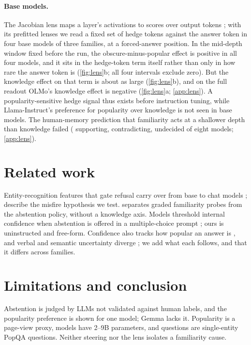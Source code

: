 \documentclass{article}
\begin{document}
\paragraph{Base models.} The Jacobian lens maps a layer's activations to scores over output tokens \citep{gurnee2026workspace}; with its prefitted lenses we read a fixed set of hedge tokens against the answer token in four base models of three families, at a forced-answer position. In the mid-depth window fixed before the run, the obscure-minus-popular effect is positive in all four models, and it sits in the hedge-token term itself rather than only in how rare the answer token is (\cref{fig:lens}b; all four intervals exclude zero). But the knowledge effect on that term is about as large (\cref{fig:lens}b), and on the full readout OLMo's knowledge effect is negative (\cref{fig:lens}a; \cref{app:lens}). A popularity-sensitive hedge signal thus exists before instruction tuning, while Llama-Instruct's preference for popularity over knowledge is not seen in base models. The human-memory prediction that familiarity acts at a shallower depth than knowledge \citep{koriat2001cascade} failed (\jlSupports{} supporting, \jlContradicts{} contradicting, \jlUndecided{} undecided of eight models; \cref{app:lens}).

\section{Related work}

Entity-recognition features that gate refusal carry over from base to chat models \citep{ferrando2025iknow}; \citet{lindsey2025biology} describe the misfire hypothesis we test. \citet{brzezinka2026familiarity} separates graded familiarity probes from the abstention policy, without a knowledge axis. Models threshold internal confidence when abstention is offered in a multiple-choice prompt \citep{kumaran2026confidence}; ours is uninstructed and free-form. Confidence also tracks how popular an answer is \citep{ni2025popular}, and verbal and semantic uncertainty diverge \citep{ji2025hedging}; we add what each follows, and that it differs across families.

\section{Limitations and conclusion}

Abstention is judged by LLMs not validated against human labels, and the popularity preference is shown for one model; Gemma lacks it. Popularity is a page-view proxy, models have 2--9B parameters, and questions are single-entity PopQA questions. Neither steering nor the lens isolates a familiarity cause.
\end{document}
